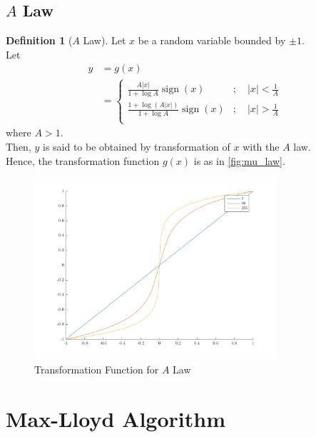 \documentclass[titlepage, fleqn, a4paper, 12pt, twoside]{article}
\theoremstyle{definition}
\newtheorem{definition}{Definition}
\theoremstyle{theorem}
\DeclareMathOperator{\sign}{\mathrm{sign}}
\begin{document}
\subsection{$A$ Law}

\begin{definition}[$A$ Law]
	Let $x$ be a random variable bounded by $\pm 1$.\\
	Let
	\begin{align*}
		y &= g(x)\\
		&=
			\begin{cases}
				\frac{A |x|}{1 + \log A} \sign(x) &;\quad |x| < \frac{1}{A}\\
				\frac{1 + \log\left( A |x| \right)}{1 + \log A} \sign(x) &;\quad |x| > \frac{1}{A}\\
			\end{cases}
	\end{align*}
	where $A > 1$.\\
	Then, $y$ is said to be obtained by transformation of $x$ with the $A$ law.\\
	Hence, the transformation function $g(x)$ is as in \cref{fig:mu_law}.
	\begin{figure}[H]
		\centering
		\includegraphics[width = 0.8\textwidth]{./Plots/A_law.pdf}
		\caption{Transformation Function for $A$ Law}
		\label{fig:transformation_function_for_A_law}
	\end{figure}
	\label{def:A_law}
\end{definition}

\section{Max-Lloyd Algorithm}
\end{document}
